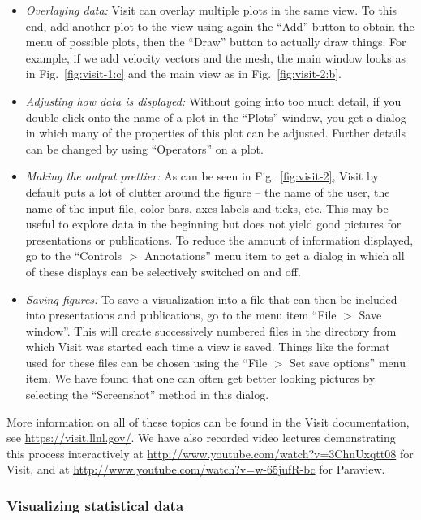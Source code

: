 \documentclass{article}
\begin{document}
\begin{itemize}
\item \textit{Overlaying data:} Visit can overlay multiple plots in the same
  view. To this end, add another plot to the view using again the ``Add''
  button to obtain the menu of possible plots, then the ``Draw'' button to
  actually draw things. For example, if we add velocity vectors and the mesh,
  the main window looks as in Fig.~\ref{fig:visit-1:c} and the main view as in
  Fig.~\ref{fig:visit-2:b}.

\item \textit{Adjusting how data is displayed:} Without going into too much
  detail, if you double click onto the name of a plot in the ``Plots'' window,
  you get a dialog in which many of the properties of this plot can be
  adjusted. Further details can be changed by using ``Operators'' on a plot.

\item \textit{Making the output prettier:} As can be seen in
  Fig.~\ref{fig:visit-2}, Visit by default puts a lot of clutter around the
  figure -- the name of the user, the name of the input file, color bars, axes
  labels and ticks, etc. This may be useful to explore data in the beginning
  but does not yield good pictures for presentations or publications. To
  reduce the amount of information displayed, go to the ``Controls $>$
  Annotations'' menu item to get a dialog in which all of these displays can
  be selectively switched on and off.

\item \textit{Saving figures:} To save a visualization into a file that can
  then be included into presentations and publications, go to the menu item
  ``File $>$ Save window''. This will create successively numbered files in
  the directory from which Visit was started each time a view is saved. Things
  like the format used for these files can be chosen using the ``File $>$ Set
  save options'' menu item. We have found that one can often get better
  looking pictures by selecting the ``Screenshot'' method in this dialog.
\end{itemize}

More information on all of these topics can be found in the Visit
documentation, see \url{https://visit.llnl.gov/}. We have also recorded
video lectures demonstrating this process interactively at
\url{http://www.youtube.com/watch?v=3ChnUxqtt08} for Visit, and at
\url{http://www.youtube.com/watch?v=w-65jufR-bc} for Paraview.


\subsubsection{Visualizing statistical data}
\label{sec:viz-stat}
\end{document}
